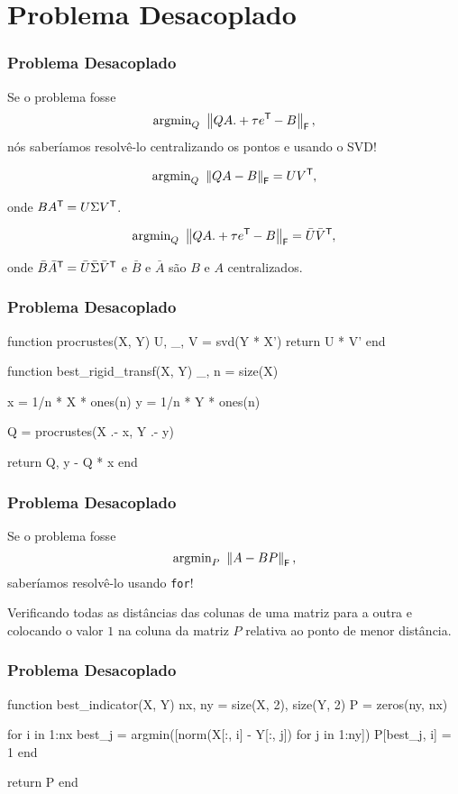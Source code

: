 
\section{Problema Desacoplado}

\begin{frame}[fragile]
  \frametitle{Problema Desacoplado}

  \begin{center}
    Se o problema fosse \[\text{argmin}_{Q}\,\, \left\lVert QA .+ \tau e^{\mathsf{T}\mkern-1mu} - B\right\rVert_\mathsf{F},\] nós saberíamos resolvê-lo centralizando os pontos e usando o SVD!

  \pause

  \[\text{argmin}_{Q}\,\, \left\lVert QA - B\right\rVert_\mathsf{F} = U V^{\mathsf{T}\mkern-1mu},\]

  onde $B A^{\mathsf{T}\mkern-1mu} = U \Sigma V^{\mathsf{T}\mkern-1mu}$.

  \pause

  \[\text{argmin}_{Q}\,\, \left\lVert QA .+ \tau e^{\mathsf{T}\mkern-1mu} - B\right\rVert_\mathsf{F} = \bar{U} \bar{V}^{\mathsf{T}\mkern-1mu},\]

  onde $\bar{B} \bar{A}^{\mathsf{T}\mkern-1mu} = \bar{U} \bar{\Sigma} \bar{V}^{\mathsf{T}\mkern-1mu}$ e $\bar{B}$ e $\bar{A}$ são $B$ e $A$ centralizados.
  \end{center}
\end{frame}

\begin{frame}[fragile]
  \frametitle{Problema Desacoplado}
  \begin{code}
    function procrustes(X, Y)
      U, _, V = svd(Y * X')
      return U * V'
    end
  \end{code}
  \pause
  \begin{code}
    function best_rigid_transf(X, Y)
      _, n = size(X)

      x = 1/n * X * ones(n)
      y = 1/n * Y * ones(n)

      Q = procrustes(X .- x, Y .- y)

      return Q, y - Q * x
    end
  \end{code}
\end{frame}



\begin{frame}[fragile]
  \frametitle{Problema Desacoplado}

  \begin{center}
    Se o problema fosse \[\text{argmin}_{P}\,\, \left\lVert A - BP\right\rVert_\mathsf{F},\] saberíamos resolvê-lo usando \texttt{for}!

    \pause
    \vspace{1cm}
    Verificando todas as distâncias das colunas de uma matriz para a outra e colocando o valor $1$ na coluna da matriz $P$ relativa ao ponto de menor distância.
  \end{center}
\end{frame}

\begin{frame}[fragile]
  \frametitle{Problema Desacoplado}
  \begin{code}
    function best_indicator(X, Y)
      nx, ny = size(X, 2), size(Y, 2)
      P = zeros(ny, nx)

      for i in 1:nx
        best_j = argmin([norm(X[:, i] - Y[:, j]) for j in 1:ny])
        P[best_j, i] = 1
      end

      return P
    end
  \end{code}
\end{frame}
